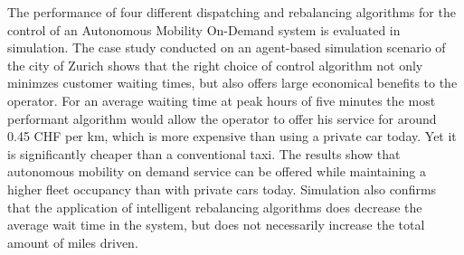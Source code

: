 The performance of four different dispatching and rebalancing algorithms for the control of an Autonomous Mobility On-Demand system is evaluated in simulation. The case study conducted on an agent-based simulation scenario of the city of Zurich shows that the right choice of control algorithm not only minimzes customer waiting times, but also offers large economical benefits to the operator. For an average waiting time at peak hours of five minutes the most performant algorithm would allow the operator to offer his service for around 0.45 CHF per km, which is more expensive than using a private car today. Yet it is significantly cheaper than a conventional taxi. The results show that autonomous mobility on demand service can be offered while maintaining a higher fleet occupancy than with private cars today. Simulation also confirms that the application of intelligent rebalancing algorithms does decrease the average wait time in the system, but does not necessarily increase the total amount of miles driven.
